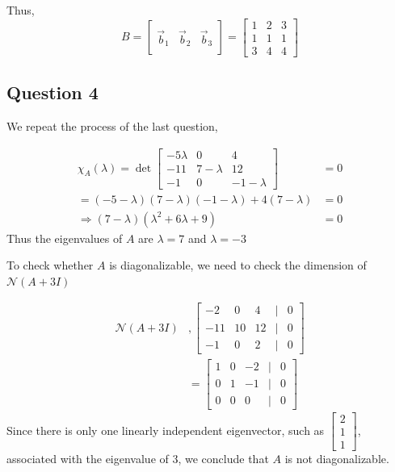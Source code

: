 \documentclass{article}
\begin{document}
Thus,
\[
B = \begin{bmatrix}
\ & \ & \ \\
\vec{b}_1 & \vec{b}_2 & \vec{b}_3 \\
\ & \ & \
\end{bmatrix} = \begin{bmatrix}
    1 & 2 & 3 \\
    1 & 1 & 1 \\
    3 & 4 & 4
\end{bmatrix}
\]

\subsection*{Question 4}
We repeat the process of the last question,

\begin{align*}
    \chi_A(\lambda) = \det \begin{bmatrix}
        -5\lambda & 0 & 4 \\
        -11 & 7 - \lambda & 12 \\
        -1 & 0 & -1 - \lambda
    \end{bmatrix} &= 0
    \\
    = (-5-\lambda)(7-\lambda)(-1-\lambda) + 4(7-\lambda) &= 0
    \\
    \Rightarrow (7-\lambda)(\lambda^2 + 6\lambda + 9) &= 0
\end{align*}
Thus the eigenvalues of \(A\) are \(\lambda = 7\) and \(\lambda = -3\)

To check whether \(A\) is diagonalizable, we need to check the dimension of \(\mathcal{N}(A+3I)\)

\begin{align*}
    \mathcal{N}(A+3I) &, \begin{bmatrix}
        -2 & 0 & 4 &| & 0 \\
        -11 & 10 & 12 &|& 0 \\
        -1 & 0 & 2& |&  0
    \end{bmatrix}
    \\
    &= \begin{bmatrix}
        1 & 0 & -2 &| & 0 \\
        0 & 1 & -1 &|& 0 \\
        0 & 0 & 0& |&  0
    \end{bmatrix}
\end{align*}
Since there is only one linearly independent eigenvector, such as \(\begin{bmatrix}
    2 \\ 1 \\ 1
\end{bmatrix}\), associated with the eigenvalue of \(3\), we conclude that \(A\) is not diagonalizable.
\\
\end{document}
